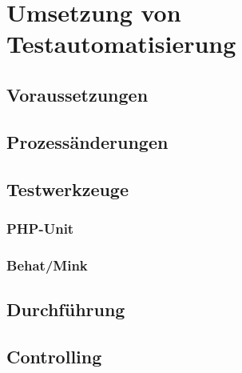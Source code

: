 \newpage
\section{Umsetzung von Testautomatisierung}

\subsection{Voraussetzungen}

\subsection{Prozessänderungen}

\subsection{Testwerkzeuge}
\subsubsection{PHP-Unit}
\subsubsection{Behat/Mink}


\subsection{Durchführung}

\subsection{Controlling}